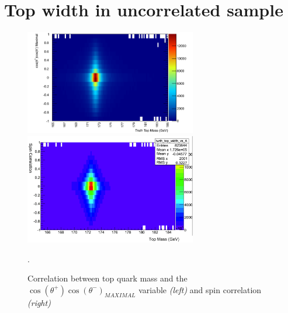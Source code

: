 \section{Top width in uncorrelated sample}

\begin{figure}[hbt]
	\begin{center}
	\includegraphics[width = 75mm]{f/TopCorrelationMass}
	\includegraphics[width = 75mm]{f/Spinvstopwidth}
	\end{center}
        \caption{Correlation between top quark mass and the $\cos(\theta^+)\cos(\theta^-)_{MAXIMAL}$ variable \emph{(left)} and spin correlation \emph{(right)}}.	
        \label{fig:top_width}
\end{figure}